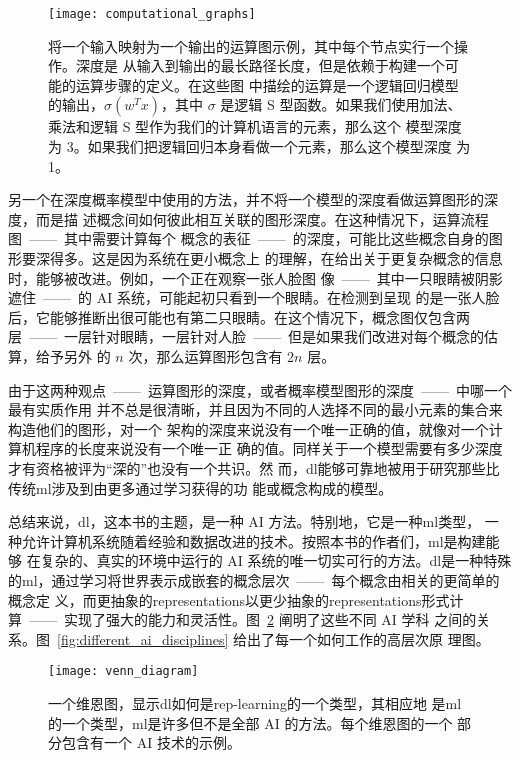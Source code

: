 \begin{figure}[h]
  \centering
  \texttt{[image: computational\_graphs]}
  \caption{将一个输入映射为一个输出的运算图示例，其中每个节点实行一个操作。深度是
    从输入到输出的最长路径长度，但是依赖于构建一个可能的运算步骤的定义。在这些图
    中描绘的运算是一个逻辑回归模型的输出，$\sigma(w^Tx)$，其中 $\sigma$ 是逻辑 S
    型函数。如果我们使用加法、乘法和逻辑 S 型作为我们的计算机语言的元素，那么这个
    模型深度为 3。如果我们把逻辑回归本身看做一个元素，那么这个模型深度
    为 1。\label{fig:computational_graphs}}
\end{figure}

另一个在深度概率模型中使用的方法，并不将一个模型的深度看做运算图形的深度，而是描
述概念间如何彼此相互关联的图形深度。在这种情况下，运算流程图~——~其中需要计算每个
概念的表征~——~的深度，可能比这些概念自身的图形要深得多。这是因为系统在更小概念上
的理解，在给出关于更复杂概念的信息时，能够被改进。例如，一个正在观察一张人脸图
像~——~其中一只眼睛被阴影遮住~——~的 AI 系统，可能起初只看到一个眼睛。在检测到呈现
的是一张人脸后，它能够推断出很可能也有第二只眼睛。在这个情况下，概念图仅包含两
层~——~一层针对眼睛，一层针对人脸~——~但是如果我们改进对每个概念的估算，给予另外
的 $n$ 次，那么运算图形包含有 $2n$ 层。

由于这两种观点~——~运算图形的深度，或者概率模型图形的深度~——~中哪一个最有实质作用
并不总是很清晰，并且因为不同的人选择不同的最小元素的集合来构造他们的图形，对一个
架构的深度来说没有一个唯一正确的值，就像对一个计算机程序的长度来说没有一个唯一正
确的值。同样关于一个模型需要有多少深度才有资格被评为``深的''也没有一个共识。然
而，\gls*{dl}能够可靠地被用于研究那些比传统\gls*{ml}涉及到由更多通过学习获得的功
能或概念构成的模型。

总结来说，\gls*{dl}，这本书的主题，是一种 AI 方法。特别地，它是一种\gls*{ml}类型，
一种允许计算机系统随着经验和数据改进的技术。按照本书的作者们，\gls*{ml}是构建能够
在复杂的、真实的环境中运行的 AI 系统的唯一切实可行的方法。\gls*{dl}是一种特殊
的\gls*{ml}，通过学习将世界表示成嵌套的概念层次~——~每个概念由相关的更简单的概念定
义，而更抽象的\gls*{representations}以更少抽象的\gls*{representations}形式计
算~——~实现了强大的能力和灵活性。图~\ref{fig:venn_diagram} 阐明了这些不同 AI 学科
之间的关系。图~\ref{fig:different_ai_disciplines} 给出了每一个如何工作的高层次原
理图。

\begin{figure}[h]
  \centering
  \texttt{[image: venn\_diagram]}
  \caption{一个维恩图，显示\gls*{dl}如何是\gls*{rep-learning}的一个类型，其相应地
    是\gls*{ml}的一个类型，\gls*{ml}是许多但不是全部 AI 的方法。每个维恩图的一个
    部分包含有一个 AI 技术的示例。\label{fig:venn_diagram}}
\end{figure}

